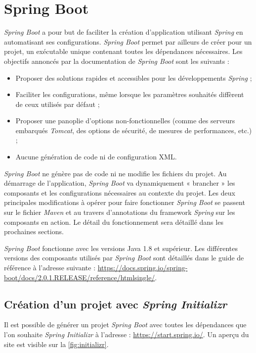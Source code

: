 \documentclass{polytech/polytech}
\begin{document}
\chapter{Spring Boot}


\textit{Spring Boot} a pour but de faciliter la création d'application utilisant \textit{Spring} en automatisant ses configurations. \textit{Spring Boot} permet par ailleurs de créer pour un projet, un exécutable unique contenant toutes les dépendances nécessaires. Les objectifs annoncés par la documentation de \textit{Spring Boot} sont les suivants : 

\begin{itemize}
	\item Proposer des solutions rapides et accessibles pour les développements \textit{Spring} ;
	\item Faciliter les configurations, même lorsque les paramètres souhaités diffèrent de ceux utilisés par défaut ;
	\item Proposer une panoplie d'options non-fonctionnelles (comme des serveurs embarqués \textit{Tomcat}, des options de sécurité, de mesures de performances, etc.) ;
	\item Aucune génération de code ni de configuration XML. 
\end{itemize}

\textit{Spring Boot} ne génère pas de code ni ne modifie les fichiers du projet. Au démarrage de l'application, \textit{Spring Boot} va dynamiquement « brancher » les composants et les configurations nécessaires au contexte du projet. Les deux principales modifications à opérer pour faire fonctionner \textit{Spring Boot} se passent sur le fichier \textit{Maven} et au travers d’annotations du framework \textit{Spring} sur les composants en action. Le détail du fonctionnement sera détaillé dans les prochaines sections. 

\textit{Spring Boot} fonctionne avec les versions Java 1.8 et supérieur. Les différentes versions des composants utilisés par \textit{Spring Boot} sont détaillés dans le guide de référence à l’adresse suivante : \url{https://docs.spring.io/spring-boot/docs/2.0.1.RELEASE/reference/htmlsingle/}.


\section{Création d'un projet avec \textit{Spring Initializr}}

Il est possible de générer un projet \textit{Spring Boot} avec toutes les dépendances que l’on souhaite \textit{Spring Initializr} à l’adresse : \url{https://start.spring.io/}. Un aperçu du site est visible sur la \autoref{fig:initializr}.
\end{document}
